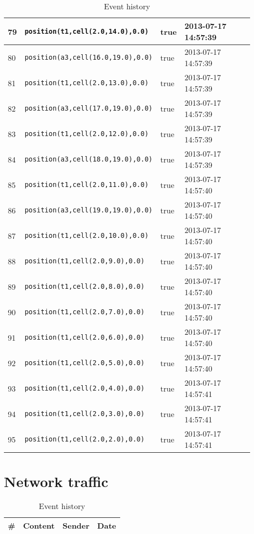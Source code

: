 \documentclass[11pt]{article}\usepackage[utf8]{inputenc}\usepackage{geometry}
\begin{document}
\begin{table}[ht]
\begin{tabular}{l l l l}
79&\texttt{position(t1,cell(2.0,14.0),0.0)}&true&2013-07-17 14:57:39\\ [1ex] \hline
80&\texttt{position(a3,cell(16.0,19.0),0.0)}&true&2013-07-17 14:57:39\\ [1ex] \hline
81&\texttt{position(t1,cell(2.0,13.0),0.0)}&true&2013-07-17 14:57:39\\ [1ex] \hline
82&\texttt{position(a3,cell(17.0,19.0),0.0)}&true&2013-07-17 14:57:39\\ [1ex] \hline
83&\texttt{position(t1,cell(2.0,12.0),0.0)}&true&2013-07-17 14:57:39\\ [1ex] \hline
84&\texttt{position(a3,cell(18.0,19.0),0.0)}&true&2013-07-17 14:57:39\\ [1ex] \hline
85&\texttt{position(t1,cell(2.0,11.0),0.0)}&true&2013-07-17 14:57:40\\ [1ex] \hline
86&\texttt{position(a3,cell(19.0,19.0),0.0)}&true&2013-07-17 14:57:40\\ [1ex] \hline
87&\texttt{position(t1,cell(2.0,10.0),0.0)}&true&2013-07-17 14:57:40\\ [1ex] \hline
88&\texttt{position(t1,cell(2.0,9.0),0.0)}&true&2013-07-17 14:57:40\\ [1ex] \hline
89&\texttt{position(t1,cell(2.0,8.0),0.0)}&true&2013-07-17 14:57:40\\ [1ex] \hline
90&\texttt{position(t1,cell(2.0,7.0),0.0)}&true&2013-07-17 14:57:40\\ [1ex] \hline
91&\texttt{position(t1,cell(2.0,6.0),0.0)}&true&2013-07-17 14:57:40\\ [1ex] \hline
92&\texttt{position(t1,cell(2.0,5.0),0.0)}&true&2013-07-17 14:57:40\\ [1ex] \hline
93&\texttt{position(t1,cell(2.0,4.0),0.0)}&true&2013-07-17 14:57:41\\ [1ex] \hline
94&\texttt{position(t1,cell(2.0,3.0),0.0)}&true&2013-07-17 14:57:41\\ [1ex] \hline
95&\texttt{position(t1,cell(2.0,2.0),0.0)}&true&2013-07-17 14:57:41\\ [1ex] \hline
\end{tabular}
\caption{Event history}
\label{events}  
\end{table}

\section{Network traffic}

\begin{table}[ht]
\centering 
\begin{tabular}{l l l l} 
\textbf{\#} & \textbf{Content} & \textbf{Sender} & \textbf{Date} \\ [0.5ex] 
\hline
\end{tabular}
\caption{Event history}
\label{events}  
\end{table}
\end{document}
